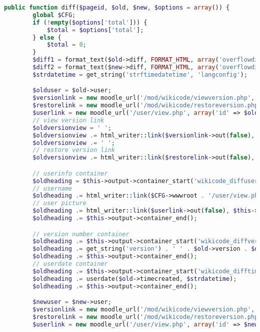 \begin{lstlisting}[language=PHP]
    public function diff($pageid, $old, $new, $options = array()) {
        global $CFG;
        if (!empty($options['total'])) {
            $total = $options['total'];
        } else {
            $total = 0;
        }
        $diff1 = format_text($old->diff, FORMAT_HTML, array('overflowdiv'=>true));
        $diff2 = format_text($new->diff, FORMAT_HTML, array('overflowdiv'=>true));
        $strdatetime = get_string('strftimedatetime', 'langconfig');

        $olduser = $old->user;
        $versionlink = new moodle_url('/mod/wikicode/viewversion.php', array('pageid' => $pageid, 'versionid' => $old->id));
        $restorelink = new moodle_url('/mod/wikicode/restoreversion.php', array('pageid' => $pageid, 'versionid' => $old->id));
        $userlink = new moodle_url('/user/view.php', array('id' => $olduser->id));
        // view version link
        $oldversionview = ' ';
        $oldversionview .= html_writer::link($versionlink->out(false), get_string('view', 'wikicode'), array('class' => 'wikicode_diffview'));
        $oldversionview .= ' ';
        // restore version link
        $oldversionview .= html_writer::link($restorelink->out(false), get_string('restore', 'wikicode'), array('class' => 'wikicode_diffview'));

        // userinfo container
        $oldheading = $this->output->container_start('wikicode_diffuserleft');
        // username
        $oldheading .= html_writer::link($CFG->wwwroot . '/user/view.php?id=' . $olduser->id, fullname($olduser)) . '&nbsp;';
        // user picture
        $oldheading .= html_writer::link($userlink->out(false), $this->output->user_picture($olduser, array('popup' => true)), array('class' => 'notunderlined'));
        $oldheading .= $this->output->container_end();

        // version number container
        $oldheading .= $this->output->container_start('wikicode_diffversion');
        $oldheading .= get_string('version') . ' ' . $old->version . $oldversionview;
        $oldheading .= $this->output->container_end();
        // userdate container
        $oldheading .= $this->output->container_start('wikicode_difftime');
        $oldheading .= userdate($old->timecreated, $strdatetime);
        $oldheading .= $this->output->container_end();

        $newuser = $new->user;
        $versionlink = new moodle_url('/mod/wikicode/viewversion.php', array('pageid' => $pageid, 'versionid' => $new->id));
        $restorelink = new moodle_url('/mod/wikicode/restoreversion.php', array('pageid' => $pageid, 'versionid' => $new->id));
        $userlink = new moodle_url('/user/view.php', array('id' => $newuser->id));


\end{lstlisting}
